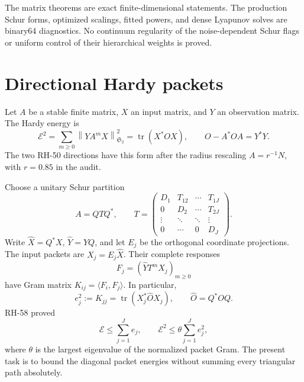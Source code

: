 \documentclass[11pt]{article}
\theoremstyle{remark}
\newcommand{\norm}[1]{\left\lVert#1\right\rVert}
\newcommand{\HS}{\mathfrak S_2}
\newcommand{\cE}{\mathcal E}
\newcommand{\tr}{\operatorname{tr}}
\begin{document}
The matrix theorems are exact finite-dimensional statements.  The production
Schur forms, optimized scalings, fitted powers, and dense Lyapunov solves are
binary64 diagnostics.  No continuum regularity of the noise-dependent Schur
flags or uniform control of their hierarchical weights is proved.

\section{Directional Hardy packets}
\label{sec:setup}

Let $A$ be a stable finite matrix, $X$ an input matrix, and $Y$ an
observation matrix.  The Hardy energy is
\begin{equation}
 \cE^2=\sum_{m\ge0}\norm{YA^mX}_{\HS}^2
 =\tr(X^*OX),
 \qquad O-A^*OA=Y^*Y.
 \label{eq:hardy}
\end{equation}
The two RH-50 directions have this form after the radius rescaling
$A=r^{-1}N$, with $r=0.85$ in the audit.

Choose a unitary Schur partition
\citep{GolubVanLoan2013,HornJohnson2013}
\begin{equation}
 A=QTQ^*,\qquad
 T=\begin{pmatrix}
 D_1&T_{12}&\cdots&T_{1J}\\
 0&D_2&\cdots&T_{2J}\\
 \vdots&\ddots&\ddots&\vdots\\
 0&\cdots&0&D_J
 \end{pmatrix}.
 \label{eq:schur}
\end{equation}
Write $\widehat X=Q^*X$, $\widehat Y=YQ$, and let $E_j$ be the orthogonal
coordinate projections.  The input packets are $X_j=E_j\widehat X$.  Their
complete responses
\begin{equation}
 F_j=(\widehat YT^mX_j)_{m\ge0}
 \label{eq:packet-response}
\end{equation}
have Gram matrix $K_{ij}=\langle F_i,F_j\rangle$.  In particular,
\begin{equation}
 e_j^2:=K_{jj}=\tr(X_j^*\widehat OX_j),
 \qquad \widehat O=Q^*OQ.
 \label{eq:packet-energy}
\end{equation}
RH-58 proved
\begin{equation}
 \cE\le\sum_{j=1}^Je_j,
 \qquad
 \cE^2\le\theta\sum_{j=1}^Je_j^2,
 \label{eq:packet-synthesis}
\end{equation}
where $\theta$ is the largest eigenvalue of the normalized packet Gram.
The present task is to bound the diagonal packet energies without summing
every triangular path absolutely.
\end{document}
